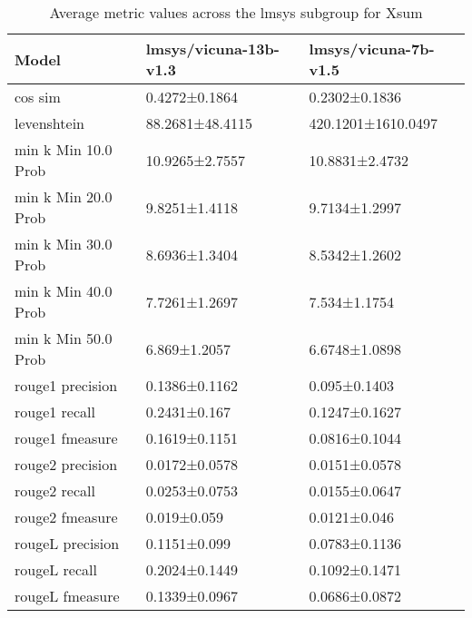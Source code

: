 \begin{table}
\caption{Average metric values across the lmsys subgroup for Xsum}
\label{tab:}
\begin{tabular}{lll}
\toprule
Model & lmsys/vicuna-13b-v1.3 & lmsys/vicuna-7b-v1.5 \\
\midrule
cos sim & 0.4272±0.1864 & 0.2302±0.1836 \\
levenshtein & 88.2681±48.4115 & 420.1201±1610.0497 \\
min k Min 10.0 Prob & 10.9265±2.7557 & 10.8831±2.4732 \\
min k Min 20.0 Prob & 9.8251±1.4118 & 9.7134±1.2997 \\
min k Min 30.0 Prob & 8.6936±1.3404 & 8.5342±1.2602 \\
min k Min 40.0 Prob & 7.7261±1.2697 & 7.534±1.1754 \\
min k Min 50.0 Prob & 6.869±1.2057 & 6.6748±1.0898 \\
rouge1 precision & 0.1386±0.1162 & 0.095±0.1403 \\
rouge1 recall & 0.2431±0.167 & 0.1247±0.1627 \\
rouge1 fmeasure & 0.1619±0.1151 & 0.0816±0.1044 \\
rouge2 precision & 0.0172±0.0578 & 0.0151±0.0578 \\
rouge2 recall & 0.0253±0.0753 & 0.0155±0.0647 \\
rouge2 fmeasure & 0.019±0.059 & 0.0121±0.046 \\
rougeL precision & 0.1151±0.099 & 0.0783±0.1136 \\
rougeL recall & 0.2024±0.1449 & 0.1092±0.1471 \\
rougeL fmeasure & 0.1339±0.0967 & 0.0686±0.0872 \\
\bottomrule
\end{tabular}
\end{table}
